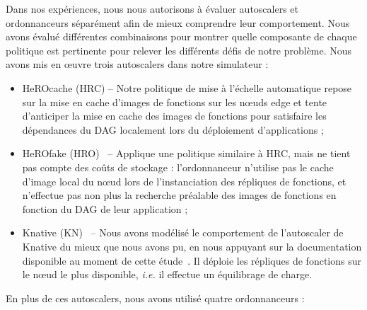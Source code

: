 Dans nos expériences, nous nous autorisons à évaluer autoscalers et ordonnanceurs séparément afin de mieux comprendre leur comportement. Nous avons évalué différentes combinaisons pour montrer quelle composante de chaque politique est pertinente pour relever les différents défis de notre problème. Nous avons mis en œuvre trois autoscalers dans notre simulateur :

\begin{itemize}
    \item HeROcache (HRC) -- Notre politique de mise à l'échelle automatique repose sur la mise en cache d'images de fonctions sur les nœuds edge et tente d'anticiper la mise en cache des images de fonctions pour satisfaire les dépendances du DAG localement lors du déploiement d'applications ;
    \item HeROfake (HRO)~\cite{herofake} -- Applique une politique similaire à HRC, mais ne tient pas compte des coûts de stockage : l'ordonnanceur n'utilise pas le cache d'image local du nœud lors de l'instanciation des répliques de fonctions, et n'effectue pas non plus la recherche préalable des images de fonctions en fonction du DAG de leur application ;
    \item Knative (KN)~\cite{sureshENSUREEfficientScheduling2020} -- Nous avons modélisé le comportement de l'autoscaler de Knative du mieux que nous avons pu, en nous appuyant sur la documentation disponible au moment de cette étude~\cite{knative-autoscaling}. Il déploie les répliques de fonctions sur le nœud le plus disponible, \textit{i.e.} il effectue un équilibrage de charge.
\end{itemize}

En plus de ces autoscalers, nous avons utilisé quatre ordonnanceurs :

